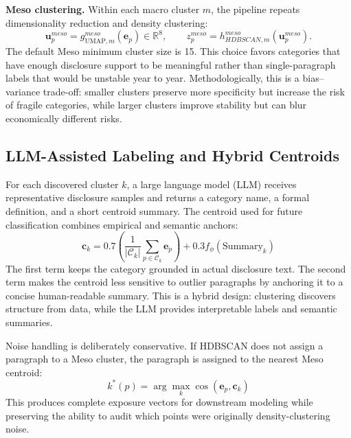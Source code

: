 \documentclass[11pt, a4paper]{article}
\begin{document}
\textbf{Meso clustering.} Within each macro cluster $m$, the pipeline repeats dimensionality reduction and density clustering:
\begin{equation}
\mathbf{u}_{p}^{meso} = g_{\text{UMAP},m}^{meso}(\mathbf{e}_{p}) \in \mathbb{R}^{8}, \qquad
z^{meso}_{p}=h^{meso}_{HDBSCAN,m}(\mathbf{u}^{meso}_{p}).
\end{equation}
The default Meso minimum cluster size is 15. This choice favors categories that have enough disclosure support to be meaningful rather than single-paragraph labels that would be unstable year to year. Methodologically, this is a bias--variance trade-off: smaller clusters preserve more specificity but increase the risk of fragile categories, while larger clusters improve stability but can blur economically different risks.

\subsection{LLM-Assisted Labeling and Hybrid Centroids}
For each discovered cluster $k$, a large language model (LLM) receives representative disclosure samples and returns a category name, a formal definition, and a short centroid summary. The centroid used for future classification combines empirical and semantic anchors:
\begin{equation}
\mathbf{c}_{k} = 0.7\left(\frac{1}{|\mathcal{C}_{k}|}\sum_{p\in\mathcal{C}_{k}}\mathbf{e}_{p}\right) + 0.3 f_{\phi}(\text{Summary}_{k})
\end{equation}
The first term keeps the category grounded in actual disclosure text. The second term makes the centroid less sensitive to outlier paragraphs by anchoring it to a concise human-readable summary. This is a hybrid design: clustering discovers structure from data, while the LLM provides interpretable labels and semantic summaries.

Noise handling is deliberately conservative. If HDBSCAN does not assign a paragraph to a Meso cluster, the paragraph is assigned to the nearest Meso centroid:
\begin{equation}
k^{*}(p) = \arg\max_{k} \cos(\mathbf{e}_{p}, \mathbf{c}_{k})
\end{equation}
This produces complete exposure vectors for downstream modeling while preserving the ability to audit which points were originally density-clustering noise.
\end{document}
